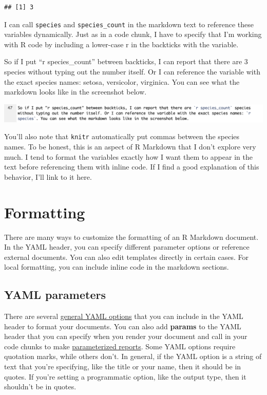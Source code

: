 \documentclass[
  openany]{book}
\begin{document}
\begin{verbatim}
## [1] 3
\end{verbatim}

I can call \texttt{species} and \texttt{species\_count} in the markdown text to reference these variables dynamically. Just as in a code chunk, I have to specify that I'm working with R code by including a lower-case r in the backticks with the variable.

So if I put ``r species\_count'' between backticks, I can report that there are 3 species without typing out the number itself. Or I can reference the variable with the exact species names: setosa, versicolor, virginica. You can see what the markdown looks like in the screenshot below.

\includegraphics[width=\textwidth]{images/content_intext_iris}

You'll also note that \texttt{knitr} automatically put commas between the species names. To be honest, this is an aspect of R Markdown that I don't explore very much. I tend to format the variables exactly how I want them to appear in the text before referencing them with inline code. If I find a good explanation of this behavior, I'll link to it here.

\hypertarget{format}{%
\chapter{Formatting}\label{format}}

There are many ways to customize the formatting of an R Markdown document. In the YAML header, you can specify different parameter options or reference external documents. You can also edit templates directly in certain cases. For local formatting, you can include inline code in the markdown sections.

\hypertarget{yaml-parameters}{%
\section{YAML parameters}\label{yaml-parameters}}

There are several \href{https://ymlthis.r-lib.org/articles/yaml-fieldguide.html}{general YAML options} that you can include in the YAML header to format your documents. You can also add \textbf{params} to the YAML header that you can specify when you render your document and call in your code chunks to make \href{https://rmarkdown.rstudio.com/developer_parameterized_reports.html\%23parameter_types\%2F}{parameterized reports}. Some YAML options require quotation marks, while others don't. In general, if the YAML option is a string of text that you're specifying, like the title or your name, then it should be in quotes. If you're setting a programmatic option, like the output type, then it shouldn't be in quotes.
\end{document}
